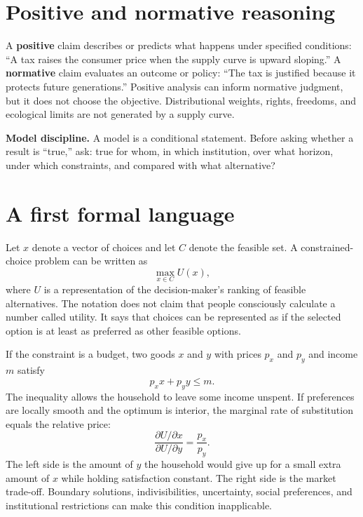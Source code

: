 \documentclass[11pt,oneside,openany]{book}
\newcommand{\term}[1]{\textbf{#1}\index{#1}}
\begin{document}
\section{Positive and normative reasoning}

A \term{positive} claim describes or predicts what happens under specified conditions: ``A tax raises the consumer price when the supply curve is upward sloping.'' A \term{normative} claim evaluates an outcome or policy: ``The tax is justified because it protects future generations.'' Positive analysis can inform normative judgment, but it does not choose the objective. Distributional weights, rights, freedoms, and ecological limits are not generated by a supply curve.

\begin{keybox}
\textbf{Model discipline.} A model is a conditional statement. Before asking whether a result is ``true,'' ask: true for whom, in which institution, over what horizon, under which constraints, and compared with what alternative?
\end{keybox}

\section{A first formal language}

Let $x$ denote a vector of choices and let $C$ denote the feasible set. A constrained-choice problem can be written as
\[
  \max_{x\in C} U(x),
\]
where $U$ is a representation of the decision-maker's ranking of feasible alternatives. The notation does not claim that people consciously calculate a number called utility. It says that choices can be represented as if the selected option is at least as preferred as other feasible options.

If the constraint is a budget, two goods $x$ and $y$ with prices $p_x$ and $p_y$ and income $m$ satisfy
\[
  p_xx+p_yy\leq m.
\]
The inequality allows the household to leave some income unspent. If preferences are locally smooth and the optimum is interior, the marginal rate of substitution equals the relative price:
\[
  \frac{\partial U/\partial x}{\partial U/\partial y}=\frac{p_x}{p_y}.
\]
The left side is the amount of $y$ the household would give up for a small extra amount of $x$ while holding satisfaction constant. The right side is the market trade-off. Boundary solutions, indivisibilities, uncertainty, social preferences, and institutional restrictions can make this condition inapplicable.
\end{document}
